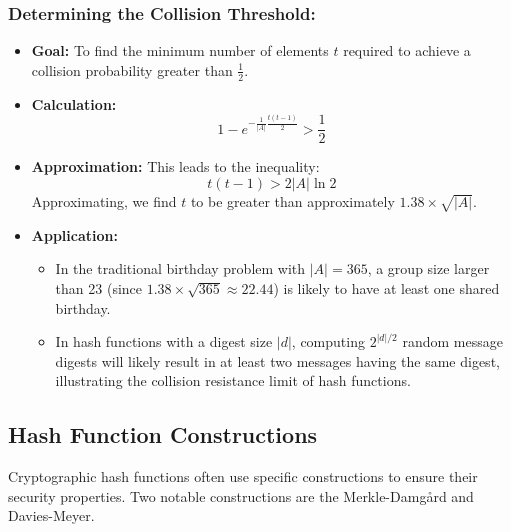 \documentclass[12pt]{article}
\begin{document}
\subsubsection*{Determining the Collision Threshold:}
\begin{itemize}
    \item \textbf{Goal:} To find the minimum number of elements \( t \) required to achieve a collision probability greater than \( \frac{1}{2} \).
    \item \textbf{Calculation:} 
    \[
    1 - e^{-\frac{1}{|A|} \frac{t(t-1)}{2}} > \frac{1}{2}
    \]
    \item \textbf{Approximation:} This leads to the inequality:
    \[
    t(t-1) > 2|A| \ln 2
    \]
    Approximating, we find \( t \) to be greater than approximately \( 1.38 \times \sqrt{|A|} \).
    \item \textbf{Application:} 
    \begin{itemize}
        \item In the traditional birthday problem with \( |A|=365 \), a group size larger than 23 (since \( 1.38 \times \sqrt{365} \approx 22.44 \)) is likely to have at least one shared birthday.
        \item In hash functions with a digest size \( |d| \), computing \( 2^{|d|/2} \) random message digests will likely result in at least two messages having the same digest, illustrating the collision resistance limit of hash functions.
    \end{itemize}
\end{itemize}

\subsection*{Hash Function Constructions}

Cryptographic hash functions often use specific constructions to ensure their security properties. Two notable constructions are the Merkle-Damgård and Davies-Meyer.
\end{document}
